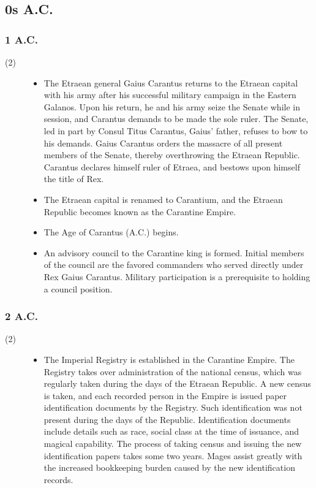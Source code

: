 \documentclass[a4paper, 11pt]{article}
\def\level#1{\item[(#1)\hspace{9.5pt}]}
\newenvironment{knowlevels}{\begin{description}}{\end{description}} %
\begin{document}
\subsection{0s A.C.}
\subsubsection{1 A.C.}
\begin{knowlevels}
\level{2} {
\begin{itemize}
\item The Etraean general Gaius Carantus returns to the Etraean capital with his army after his successful military campaign in the Eastern Galanos.  Upon his return, he and his army seize the Senate while in session, and Carantus demands to be made the sole ruler.  The Senate, led in part by Consul Titus Carantus, Gaius' father, refuses to bow to his demands.  Gaius Carantus orders the massacre of all present members of the Senate, thereby overthrowing the Etraean Republic.  Carantus declares himself ruler of Etraea, and bestows upon himself the title of Rex.

\item The Etraean capital is renamed to Carantium, and the Etraean Republic becomes known as the Carantine Empire.

\item The Age of Carantus (A.C.) begins.

\item An advisory council to the Carantine king is formed.  Initial members of the council are the favored commanders who served directly under Rex Gaius Carantus.  Military participation is a prerequisite to holding a council position.
\end{itemize}
}
\end{knowlevels}

\subsubsection{2 A.C.}
\begin{knowlevels}
\level{2} {
\begin{itemize}
\item  The Imperial Registry is established in the Carantine Empire.  The Registry takes over administration of the national census, which was regularly taken during the days of the Etraean Republic.  A new census is taken, and each recorded person in the Empire is issued paper identification documents by the Registry.  Such identification was not present during the days of the Republic.  Identification documents include details such as race, social class at the time of issuance, and magical capability.  The process of taking census and issuing the new identification papers takes some two years.  Mages assist greatly with the increased bookkeeping burden caused by the new identification records.
\end{itemize}
}
\end{knowlevels}
\end{document}
